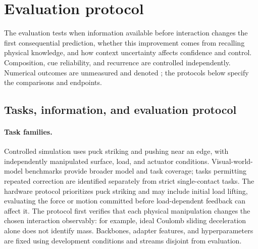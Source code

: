 \section{Evaluation protocol}\label{sec:experiments}

The evaluation tests when information available before interaction changes the first consequential prediction, whether this improvement comes from recalling physical knowledge, and how context uncertainty affects confidence and control. Composition, cue reliability, and recurrence are controlled independently. Numerical outcomes are unmeasured and denoted \placeholder{}; the protocols below specify the comparisons and endpoints.

\subsection{Tasks, information, and evaluation protocol}

\paragraph{Task families.}
Controlled simulation uses puck striking and pushing near an edge, with independently manipulated surface, load, and actuator conditions. Visual-world-model benchmarks provide broader model and task coverage; tasks permitting repeated correction are identified separately from strict single-contact tasks. The hardware protocol prioritizes puck striking and may include initial load lifting, evaluating the force or motion committed before load-dependent feedback can affect it. The protocol first verifies that each physical manipulation changes the chosen interaction observably: for example, ideal Coulomb sliding deceleration alone does not identify mass. Backbones, adapter features, and hyperparameters are fixed using development conditions and streams disjoint from evaluation.

